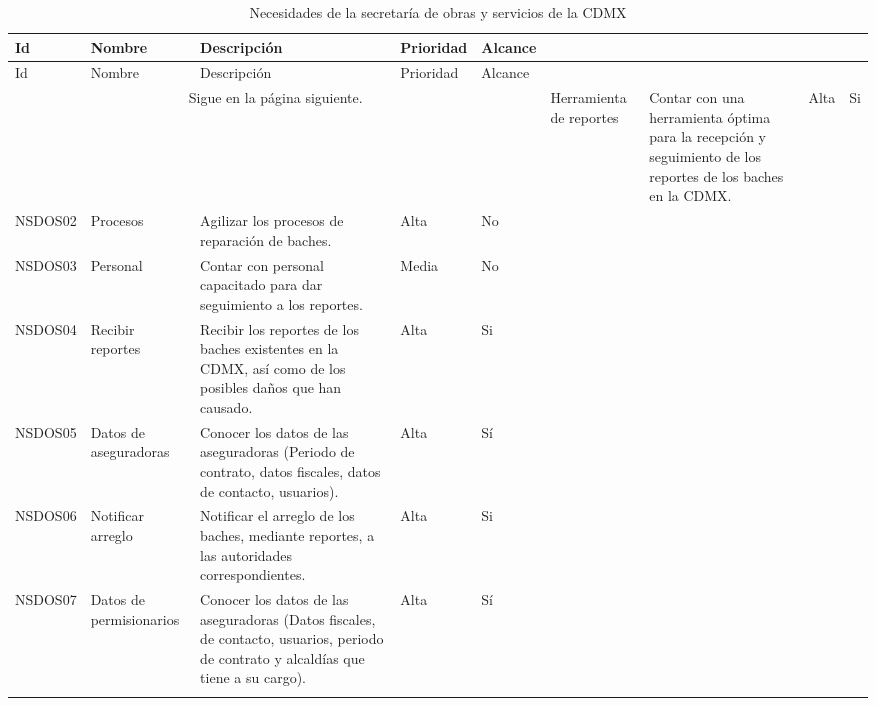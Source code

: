 \begin{longtable}{|m{1.5cm}|m{3cm}|m{5cm}|m{2cm}| m{2cm}|}\rowcolor[HTML]{3531FF} 
        {\color[HTML]{FFFFFF} Id} &{\color[HTML]{FFFFFF}Nombre} & {\color[HTML]{FFFFFF} Descripción} & {\color[HTML]{FFFFFF}Prioridad} & {\color[HTML]{FFFFFF}Alcance}\\
        \hline
        \endfirsthead
        \hline
        \rowcolor[HTML]{3531FF} 
        {\color[HTML]{FFFFFF} Id} &{\color[HTML]{FFFFFF}Nombre} & {\color[HTML]{FFFFFF} Descripción} & {\color[HTML]{FFFFFF}Prioridad} & {\color[HTML]{FFFFFF}Alcance}\\
        \hline 
        \endhead
        \multicolumn{5}{c}{Sigue en la página siguiente.}
        \endfoot
        \endlastfoot
        NSDOS01 & Herramienta de reportes & Contar con una herramienta óptima para la recepción y seguimiento de los reportes de los baches en la CDMX. & Alta & Si \\
        \hline
        
        NSDOS02 & Procesos & Agilizar los procesos de reparación de baches. & Alta & No \\
        \hline
        
        NSDOS03 & Personal & Contar con personal capacitado para dar seguimiento a los reportes. & Media & No\\ 
        \hline
        
        NSDOS04 & Recibir reportes & Recibir los reportes de los baches existentes en la CDMX, así como de los posibles daños que han causado.  & Alta & Si\\
        \hline
        
        NSDOS05 & Datos de aseguradoras & Conocer los datos de las aseguradoras (Periodo de contrato, datos fiscales, datos de contacto, usuarios). & Alta & Sí \\
        \hline
        
        NSDOS06 & Notificar arreglo & Notificar el arreglo de los baches, mediante reportes, a las autoridades correspondientes. & Alta & Si\\
        \hline
        
        NSDOS07 & Datos de permisionarios & Conocer los datos de las aseguradoras (Datos fiscales, de contacto, usuarios, periodo de contrato y alcaldías que tiene a su cargo). & Alta & Sí \\
        \hline
        
        
    \caption{Necesidades de la secretaría de obras y servicios de la CDMX}
    \label{tab:NPDS}
\end{longtable}


